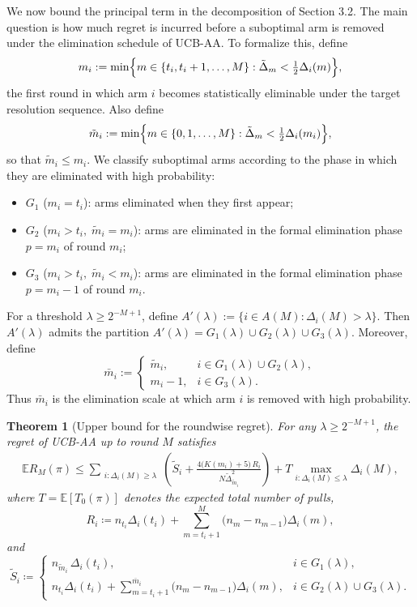\documentclass[
  12pt]{article}
\newtheorem{theorem}{Theorem}
\begin{document}
We now bound the principal term in the decomposition of Section 3.2.
The main question is how much regret is incurred before a suboptimal arm is removed under
the elimination schedule of UCB-AA.
To formalize this, define
\[
m_i:=\min\Bigl\{m\in\{t_i,t_i+1,\dots,M\}:\tilde\Delta_m<\tfrac12\Delta_i(m)\Bigr\},
\]
the first round in which arm \(i\) becomes statistically eliminable under the target
resolution sequence. Also define
\[
\tilde m_i:=\min\Bigl\{m\in\{0,1,\dots,M\}:\tilde\Delta_m<\tfrac12\Delta_i(m_i)\Bigr\},
\]
so that \(\tilde m_i\le m_i\).
We classify suboptimal arms according to the phase in which they are eliminated with high
probability:
\begin{itemize}
    \item \(G_1\) ($m_i=t_i$): arms eliminated when they first appear;
    \item \(G_2\) ($m_i>t_i,\;\tilde{m}_i=m_i$): arms are eliminated in the formal elimination phase \(p=m_i\) of round \(m_i\);
    \item \(G_3\) ($m_i>t_i,\;\tilde{m}_i<m_i$): arms are eliminated in the formal elimination phase \(p=m_i-1\) of round \(m_i\).
\end{itemize}

For a threshold \(\lambda \ge 2^{-M+1}\), define
\(
A'(\lambda):=\{i\in A(M):\Delta_i(M)>\lambda\}.
\)
Then \(A'(\lambda)\) admits the partition
\(
A'(\lambda)=G_1(\lambda)\cup G_2(\lambda)\cup G_3(\lambda).
\)
Moreover, define
\[
\bar m_i:=
\begin{cases}
\tilde m_i, & i\in G_1(\lambda)\cup G_2(\lambda),\\
m_i-1, & i\in G_3(\lambda).
\end{cases}
\]
Thus \(\bar m_i\) is the elimination scale at which arm \(i\) is removed with high probability.

\begin{theorem}[Upper bound for the roundwise regret]
\label{thm:ucb-aa-upper}
For any $\lambda\geq 2^{-M+1}$, the regret of UCB-AA up to round $M$ satisfies
\begin{align*}
\mathbb{E}R_M(\pi)
\leq
\sum_{\substack{i: \Delta_i(M) \geq \lambda}}
\left(
\tilde{S}_i
+
\frac{4\bigl(K(m_i)+5\bigr)\,R_i}{N\tilde{\Delta}_{\tilde{m}_i}^2}
\right)
+
T\max_{i:\Delta_i(M)\leq \lambda}\Delta_i(M),
\end{align*}
where $T = \mathbb{E}[T_0(\pi)]$ denotes the expected total number of pulls,
\[
R_i\coloneqq n_{t_i}\Delta_i(t_i)+\sum_{m=t_i+1}^M\bigl(n_m-n_{m-1}\bigr)\Delta_i(m),
\]
and
\[
\tilde{S}_i\coloneqq
\begin{cases}
    n_{\tilde{m}_i}\,\Delta_i(t_i), & i\in G_1(\lambda),\\
    n_{t_i}\Delta_i(t_i)+\sum_{m=t_i+1}^{\overline{m}_i}\bigl(n_m-n_{m-1}\bigr)\Delta_i(m), & i\in G_2(\lambda)\cup G_3(\lambda).
\end{cases}
\]
\end{theorem}
\end{document}
